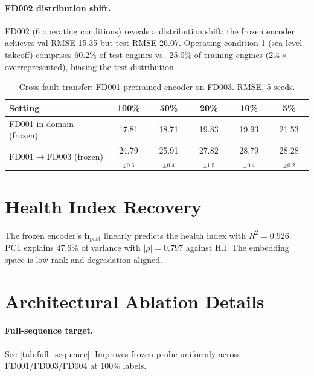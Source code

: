 \documentclass{article}
\newcommand{\h}{\mathbf{h}}
\begin{document}
\paragraph{FD002 distribution shift.}
\label{app:fd002}
FD002 (6 operating conditions) reveals a distribution shift: the frozen encoder achieves val RMSE 15.35 but test RMSE 26.07. Operating condition 1 (sea-level takeoff) comprises 60.2\% of test engines vs.\ 25.0\% of training engines ($2.4\times$ overrepresented), biasing the test distribution.

\begin{table}[h]
\centering
\caption{Cross-fault transfer: FD001-pretrained encoder on FD003. RMSE, 5 seeds.}
\label{tab:crossfault}
\small
\begin{tabular}{@{}lccccc@{}}
\toprule
Setting & 100\% & 50\% & 20\% & 10\% & 5\% \\
\midrule
FD001 in-domain (frozen) & 17.81 & 18.71 & 19.83 & 19.93 & 21.53 \\
FD001$\to$FD003 (frozen) & 24.79$_{\pm0.6}$ & 25.91$_{\pm0.4}$ & 27.82$_{\pm1.5}$ & 28.79$_{\pm0.4}$ & 28.28$_{\pm0.2}$ \\
\bottomrule
\end{tabular}
\end{table}

\section{Health Index Recovery}
\label{app:health_index}

The frozen encoder's $\h_\text{past}$ linearly predicts the health index with $R^2 = 0.926$. PC1 explains 47.6\% of variance with $|\rho| = 0.797$ against H.I. The embedding space is low-rank and degradation-aligned.

\section{Architectural Ablation Details}
\label{app:ablation_details}

\paragraph{Full-sequence target.} See \cref{tab:full_sequence}. Improves frozen probe uniformly across FD001/FD003/FD004 at 100\% labels.
\end{document}
